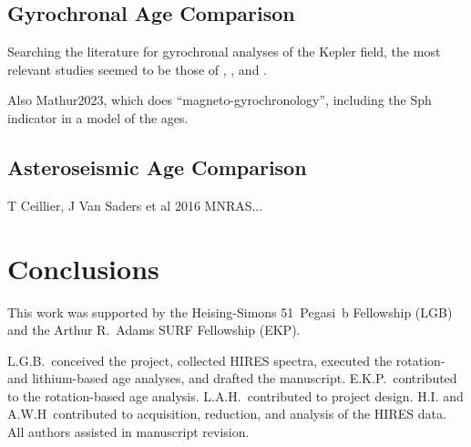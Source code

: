 \documentclass[11pt,twocolumn,tighten]{aastex63}
\begin{document}
\subsection{Gyrochronal Age Comparison}
Searching the literature for gyrochronal analyses of the Kepler field,
the most relevant studies seemed to be those of
\citet{Walkowicz_2013}, \citet{Reinhold_2015}, and 
\citet{David_2021}.

Also Mathur2023, which does ``magneto-gyrochronology'', including the
Sph indicator in a model of the ages.


\subsection{Asteroseismic Age Comparison}
T Ceillier, J Van Saders et al 2016 MNRAS...


\section{Conclusions}
\label{sec:conclusions}

\acknowledgements
This work was supported by the 
Heising-Simons 51~Pegasi~b Fellowship (LGB)
and the Arthur R.~Adams SURF Fellowship (EKP).

L.G.B.~conceived the project, collected HIRES spectra, executed the
rotation- and lithium-based age analyses, and drafted the manuscript.
E.K.P.~contributed to the rotation-based age analysis.
L.A.H.~contributed to project design.
H.I. and A.W.H~contributed to acquisition, reduction, and analysis of
the HIRES data.
All authors assisted in manuscript revision.









\clearpage
\listofchanges
\end{document}
